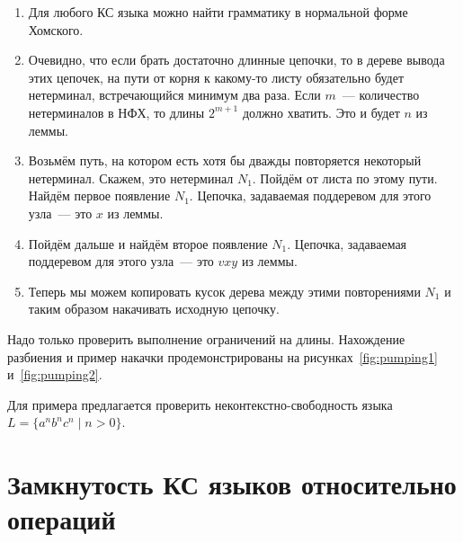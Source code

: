 \begin{proofSketch}

    \begin{enumerate}
        \item Для любого КС языка можно найти грамматику в нормальной форме Хомского.
        \item Очевидно, что если брать достаточно длинные цепочки, то в дереве вывода этих цепочек, на пути от корня к какому-то листу обязательно будет нетерминал, встречающийся минимум два раза. Если $m$~--- количество нетерминалов в НФХ, то длины $2^{m+1}$ должно хватить. Это и будет $n$ из леммы.
        \item Возьмём путь, на котором есть хотя бы дважды повторяется некоторый нетерминал. Скажем, это нетерминал  $N_1$. Пойдём от листа по этому пути. Найдём первое появление $N_1$. Цепочка, задаваемая поддеревом для этого узла~--- это $x$ из леммы.
        \item Пойдём дальше и найдём второе появление $N_1$. Цепочка, задаваемая поддеревом для этого узла~--- это $vxy$ из леммы.
        \item Теперь мы можем копировать кусок дерева между этими повторениями $N_1$ и таким образом накачивать исходную цепочку.
    \end{enumerate}
    Надо только проверить выполнение ограничений на длины.
    Нахождение разбиения и пример накачки продемонстрированы на рисунках~\ref{fig:pumping1} и~\ref{fig:pumping2}.
\end{proofSketch}


Для примера предлагается проверить неконтекстно-свободность языка $L=\{a^nb^nc^n \mid n>0\}$.

\section{Замкнутость КС языков относительно операций}

